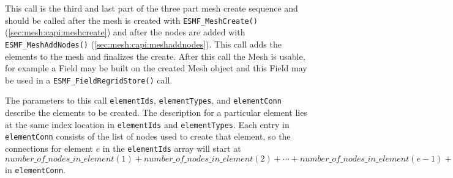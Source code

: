     This call is the third and last part of the three part mesh create
     sequence and should be called after the mesh is created with {\tt ESMF\_MeshCreate()}
     (\ref{sec:mesh:capi:meshcreate})
     and after the nodes are added with {\tt ESMF\_MeshAddNodes()} (\ref{sec:mesh:capi:meshaddnodes}).
     This call adds the elements to the
     mesh and finalizes the create. After this call the Mesh is usable, for
     example a Field may be built on the created Mesh object and
     this Field may be used in a {\tt ESMF\_FieldRegridStore()} call.
  
     The parameters to this call {\tt elementIds}, {\tt elementTypes}, and
     {\tt elementConn} describe the elements to be created. The description
     for a particular element lies at the same index location in {\tt elementIds}
     and {\tt elementTypes}. Each entry in {\tt elementConn} consists of the list of
     nodes used to create that element, so the connections for element $e$ in the
     {\tt elementIds} array will start at $number\_of\_nodes\_in\_element(1) + number\_of\_nodes\_in\_element(2) +
     \cdots + number\_of\_nodes\_in\_element(e-1) + 1$ in {\tt elementConn}.
  
